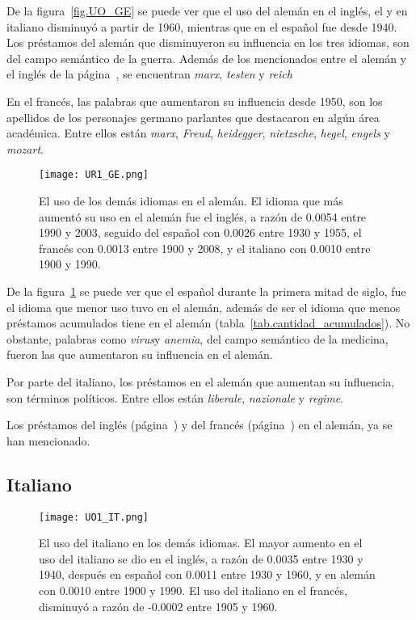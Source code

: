 De la figura~\ref{fig.UO_GE} se puede ver que el uso del alemán en el inglés, el y en italiano disminuyó a partir de 1960, mientras que en el español fue desde 1940. Los préstamos del alemán que disminuyeron su influencia en los tres idiomas, son del campo semántico de la guerra. Además de los mencionados entre el alemán y el inglés de la página~\pageref{D-EN}, se encuentran \textit{marx}, \textit{testen} y \textit{reich}

En el francés, las palabras que aumentaron su influencia desde 1950,  son los apellidos de los personajes germano parlantes que destacaron en algún área académica. Entre ellos están \textit{marx}, \textit{Freud}, \textit{heidegger}, \textit{nietzsche}, \textit{hegel}, \textit{engels} y \textit{mozart}.
\label{GE-D}


\begin{figure}[h!]
	\centering
	\texttt{[image: UR1\_GE.png]}
	\caption{El uso de los demás idiomas en el alemán. El idioma que más aumentó su uso en el alemán fue el inglés, a razón de 0.0054   entre 1990 y 2003, seguido del español con 0.0026 entre 1930 y 1955, el francés con 0.0013 entre 1900 y 2008, y el italiano con 0.0010 entre 1900 y 1990.}
	\label{fig.UR_GE}
\end{figure}

De la figura~\ref{fig.UR_GE} se puede ver que el español durante la primera mitad de siglo, fue el idioma que menor uso tuvo en el alemán,  además de ser el idioma que menos préstamos acumulados tiene en el alemán (tabla~\ref{tab.cantidad_acumulados}). No obstante, palabras como  \textit{virus}y \textit{anemia}, del campo semántico de la medicina, fueron las que aumentaron su influencia en el alemán.

Por parte del italiano, los préstamos en el alemán que aumentan su influencia, son términos políticos. Entre ellos están \textit{liberale}, \textit{nazionale} y \textit{regime}. 

Los préstamos del inglés (página~\pageref{EN-D}) y del francés (página~\pageref{FR-D}) en el alemán, ya se han mencionado. 
\label{D-GE}

\subsection{Italiano} %

\begin{figure}[h!]
	\centering
	\texttt{[image: UO1\_IT.png]}
	\caption{El uso del italiano en los demás idiomas. El mayor aumento en el uso del italiano se dio en el inglés, a razón de 0.0035 entre 1930 y 1940, después en español con 0.0011 entre 1930 y 1960, y en alemán con 0.0010 entre 1900 y 1990. El uso del italiano en el francés, disminuyó a razón de -0.0002  entre 1905 y 1960.}
	\label{fig.UO_IT}
\end{figure}
		
